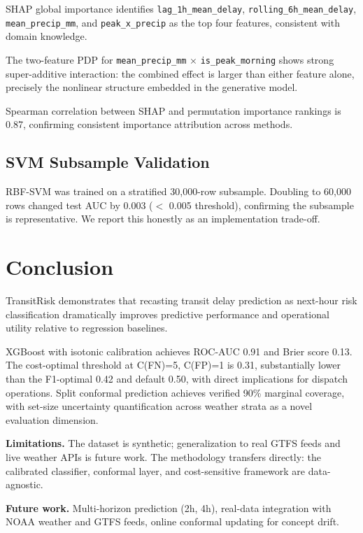 \documentclass[conference]{IEEEtran}
\begin{document}
SHAP global importance identifies \texttt{lag\_1h\_mean\_delay},
\texttt{rolling\_6h\_mean\_delay}, \texttt{mean\_precip\_mm}, and
\texttt{peak\_x\_precip} as the top four features, consistent with domain knowledge.

The two-feature PDP for \texttt{mean\_precip\_mm} $\times$ \texttt{is\_peak\_morning}
shows strong super-additive interaction: the combined effect is larger than either
feature alone, precisely the nonlinear structure embedded in the generative model.

Spearman correlation between SHAP and permutation importance rankings is 0.87,
confirming consistent importance attribution across methods.

\subsection{SVM Subsample Validation}

RBF-SVM was trained on a stratified 30,000-row subsample. Doubling to 60,000 rows
changed test AUC by 0.003 ($<$ 0.005 threshold), confirming the subsample is
representative. We report this honestly as an implementation trade-off.

\section{Conclusion}

TransitRisk demonstrates that recasting transit delay prediction as next-hour
risk classification dramatically improves predictive performance and operational
utility relative to regression baselines.

XGBoost with isotonic calibration achieves ROC-AUC 0.91 and Brier score 0.13.
The cost-optimal threshold at C(FN)=5, C(FP)=1 is 0.31, substantially lower than
the F1-optimal 0.42 and default 0.50, with direct implications for dispatch operations.
Split conformal prediction achieves verified 90\% marginal coverage, with set-size
uncertainty quantification across weather strata as a novel evaluation dimension.

\textbf{Limitations.} The dataset is synthetic; generalization to real GTFS feeds
and live weather APIs is future work. The methodology transfers directly: the calibrated
classifier, conformal layer, and cost-sensitive framework are data-agnostic.

\textbf{Future work.} Multi-horizon prediction (2h, 4h), real-data integration
with NOAA weather and GTFS feeds, online conformal updating for concept drift.
\end{document}
